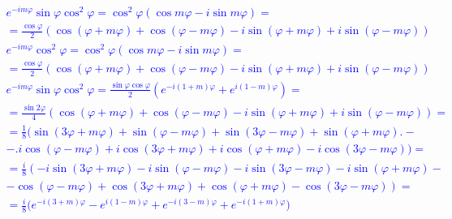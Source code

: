 %
\textcolor{blue}{ \begin{equation*} \begin{aligned}
e^{-i m \varphi} \sin \varphi \cos^2 \varphi = \cos^2 \varphi
\left( \cos m \varphi - i \sin m \varphi \right) = \\ = \frac{\cos \varphi}{2} 
\left( \cos (\varphi + m \varphi) + \cos (\varphi - m \varphi) - 
i \sin (\varphi + m \varphi) + i \sin (\varphi - m \varphi) \right)
\end{aligned} \end{equation*} }
%
\textcolor{blue}{ \begin{equation*} \begin{aligned}
e^{-i m \varphi} \cos^2 \varphi = \cos^2 \varphi
\left( \cos m \varphi - i \sin m \varphi \right) = \\ = \frac{\cos \varphi}{2} 
\left( \cos (\varphi + m \varphi) + \cos (\varphi - m \varphi) - 
i \sin (\varphi + m \varphi) + i \sin (\varphi - m \varphi) \right)
\end{aligned} \end{equation*} }
%
\textcolor{blue}{ \begin{equation*} \begin{aligned}
e^{-i m \varphi} \sin \varphi \cos^2 \varphi = 
\frac{ \sin \varphi \cos \varphi } { 2 } 
\left( e^{-i (1+m) \varphi} + e^{i (1-m) \varphi} \right) = \\
= \frac{ \sin 2 \varphi } { 4 } 
\left( \cos (\varphi + m \varphi) + \cos (\varphi - m \varphi) - 
i \sin (\varphi + m \varphi) + i \sin (\varphi - m \varphi) \right) = \\
= \frac{1}{8} \big( \sin (3 \varphi + m \varphi) + 
\sin (\varphi - m \varphi) + \sin (3 \varphi - m \varphi) + 
\sin (\varphi + m \varphi) \big. - \\ 
- \big. i \cos (\varphi - m \varphi) + i \cos (3 \varphi + m \varphi) + 
i \cos (\varphi + m \varphi) - i \cos (3 \varphi - m \varphi) \big) = \\
= \frac{i}{8} \left( - i \sin (3 \varphi + m \varphi) - i 
\sin (\varphi - m \varphi) - i \sin (3 \varphi - m \varphi) - i 
\sin (\varphi + m \varphi) \right. - \\ 
- \left. \cos (\varphi - m \varphi) + \cos (3 \varphi + m \varphi) + 
\cos (\varphi + m \varphi) - \cos (3 \varphi - m \varphi) \right) = \\
= \frac{i}{8} \big( e^{-i (3+m) \varphi} - e^{i (1-m) \varphi} + 
e^{-i (3-m) \varphi} + e^{-i (1+m) \varphi} \big)
\end{aligned} \end{equation*} }
